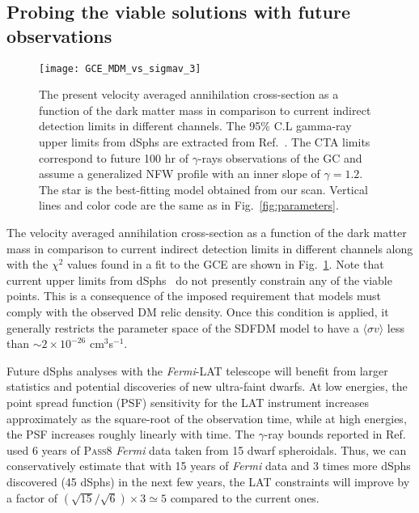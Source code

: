 \subsection{Probing the viable solutions with future observations}
\begin{figure}[t]
\begin{center}
\texttt{[image: GCE\_MDM\_vs\_sigmav\_3]} 
\caption{The present velocity averaged annihilation cross-section as a function of the dark matter mass in comparison to current indirect detection limits in different channels. 
The 95\% C.L gamma-ray upper limits from dSphs are extracted from Ref.~\cite{Ackermann:2015zua}. The CTA limits correspond to future 100 hr of $\gamma$-rays observations of the GC and assume a generalized NFW profile with an inner slope of $\gamma=1.2$.
The star is the best-fitting model obtained from our scan. 
Vertical lines and color code are the same as in Fig.~\ref{fig:parameters}.}
\label{fig:sigmav}
\end{center}
\end{figure}
The velocity averaged annihilation cross-section as a function of the dark matter mass in
comparison to current indirect detection limits in different channels along with the $\chi^2$ values found in a fit to the GCE are shown in Fig.~\ref{fig:sigmav}. 
Note that current upper limits from dSphs~\cite{Ackermann:2015zua} do not presently constrain any of the viable points. This is a consequence of the imposed requirement that models must comply with the observed DM relic density. Once this condition is applied, it generally restricts the parameter space of the SDFDM model to have a $\langle\sigma v\rangle$ less than $\sim 2\times 10^{-26}$ cm$^3$s$^{-1}$.

Future dSphs analyses with the \textit{Fermi}-LAT telescope will benefit from larger statistics and potential discoveries of new ultra-faint dwarfs. At low energies, the point spread function (PSF) sensitivity for the LAT instrument increases approximately as the square-root of the observation time, while at high energies, the PSF increases roughly linearly with time. The $\gamma$-ray bounds reported in Ref.~\cite{Ackermann:2015zua} used 6 years of \textsc{Pass8} \textit{Fermi} data taken from 15 dwarf spheroidals. Thus, we can conservatively estimate that with 15 years of \textit{Fermi} data and 3 times more dSphs discovered (45 dSphs) in the next few years, the LAT constraints will improve by a factor of $(\sqrt{15}/\sqrt{6})\times 3 \simeq 5$ compared to the current ones. 

